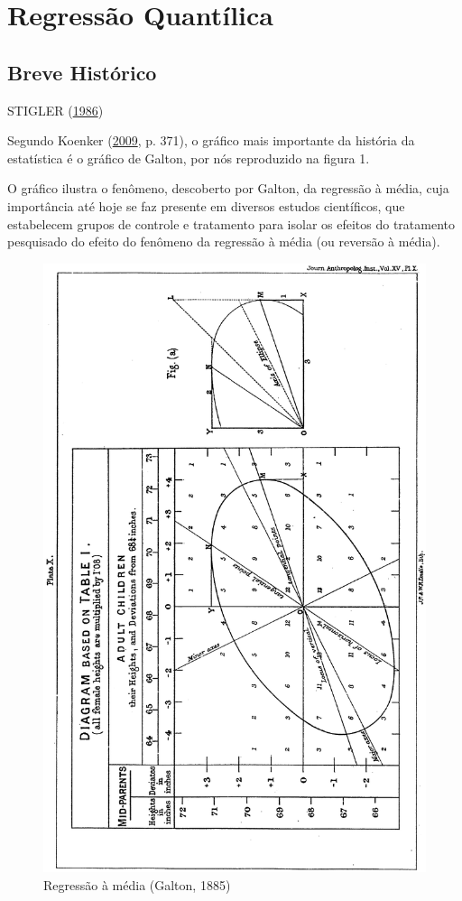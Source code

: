 \documentclass[a4paper, 12pt]{article}
\begin{document}
\hypertarget{regressao-quantilica}{%
\section{Regressão Quantílica}\label{regressao-quantilica}}

\hypertarget{breve-historico}{%
\subsection{Breve Histórico}\label{breve-historico}}

STIGLER (\protect\hyperlink{ref-stigler1986}{1986})

Segundo Koenker (\protect\hyperlink{ref-mim}{2009}, p. 371), o gráfico
mais importante da história da estatística é o gráfico de Galton, por
nós reproduzido na figura 1.

O gráfico ilustra o fenômeno, descoberto por Galton, da regressão à
média, cuja importância até hoje se faz presente em diversos estudos
científicos, que estabelecem grupos de controle e tratamento para isolar
os efeitos do tratamento pesquisado do efeito do fenômeno da regressão à
média (ou reversão à média).

\begin{figure}
\centering
\includegraphics{image_Galton.png}
\caption{Regressão à média (Galton, 1885)}
\end{figure}
\end{document}
